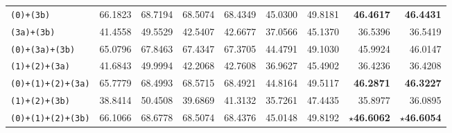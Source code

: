 \begin{table}[!htbp]
{\begin{tabular}{l|rr|rr|rr|rr}
            \texttt{(0)+(3b)}                   & 66.1823                                        & 68.7194                                      & 68.5074                                       & 68.4349                                     & 45.0300                 & 49.8181                 & \textbf{46.4617}        & \textbf{46.4431}        \\
            \texttt{(3a)+(3b)}                  & 41.4558                                        & 49.5529                                      & 42.5407                                       & 42.6677                                     & 37.0566                 & 45.1370                 & 36.5396                 & 36.5419                 \\
            \texttt{(0)+(3a)+(3b)}              & 65.0796                                        & 67.8463                                      & 67.4347                                       & 67.3705                                     & 44.4791                 & 49.1030                 & 45.9924                 & 46.0147                 \\
            \texttt{(1)+(2)+(3a)}               & 41.6843                                        & 49.9994                                      & 42.2068                                       & 42.7608                                     & 36.9627                 & 45.4902                 & 36.4236                 & 36.4208                 \\
            \texttt{(0)+(1)+(2)+(3a)}           & 65.7779                                        & 68.4993                                      & 68.5715                                       & 68.4921                                     & 44.8164                 & 49.5117                 & \textbf{46.2871}        & \textbf{46.3227}        \\
            \texttt{(1)+(2)+(3b)}               & 38.8414                                        & 50.4508                                      & 39.6869                                       & 41.3132                                     & 35.7261                 & 47.4435                 & 35.8977                 & 36.0895                 \\
            \texttt{(0)+(1)+(2)+(3b)}           & 66.1066                                        & 68.6778                                      & 68.5074                                       & 68.4376                                     & 45.0148                 & 49.8192                 & \textbf{$\star$46.6062} & \textbf{$\star$46.6054} \\

\end{tabular}}
\end{table}
